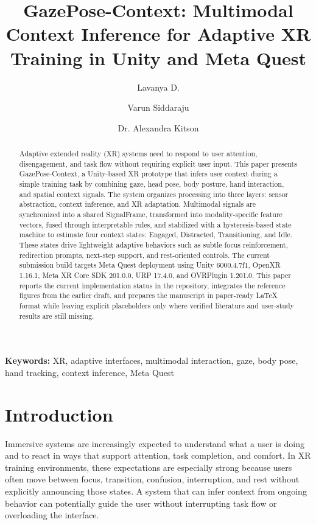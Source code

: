 \documentclass[10pt,twocolumn]{article}
\title{\textbf{GazePose-Context: Multimodal Context Inference for Adaptive XR Training in Unity and Meta Quest}}
\author{
  Lavanya D. \and Varun Siddaraju \and Dr. Alexandra Kitson
}
\date{}
\begin{document}
\maketitle

\begin{abstract}
Adaptive extended reality (XR) systems need to respond to user attention, disengagement, and task flow without requiring explicit user input. This paper presents GazePose-Context, a Unity-based XR prototype that infers user context during a simple training task by combining gaze, head pose, body posture, hand interaction, and spatial context signals. The system organizes processing into three layers: sensor abstraction, context inference, and XR adaptation. Multimodal signals are synchronized into a shared SignalFrame, transformed into modality-specific feature vectors, fused through interpretable rules, and stabilized with a hysteresis-based state machine to estimate four context states: Engaged, Distracted, Transitioning, and Idle. These states drive lightweight adaptive behaviors such as subtle focus reinforcement, redirection prompts, next-step support, and rest-oriented controls. The current submission build targets Meta Quest deployment using Unity 6000.4.7f1, OpenXR 1.16.1, Meta XR Core SDK 201.0.0, URP 17.4.0, and OVRPlugin 1.201.0. This paper reports the current implementation status in the repository, integrates the reference figures from the earlier draft, and prepares the manuscript in paper-ready LaTeX format while leaving explicit placeholders only where verified literature and user-study results are still missing.
\end{abstract}

\textbf{Keywords:} XR, adaptive interfaces, multimodal interaction, gaze, body pose, hand tracking, context inference, Meta Quest

\section{Introduction}
Immersive systems are increasingly expected to understand what a user is doing and to react in ways that support attention, task completion, and comfort. In XR training environments, these expectations are especially strong because users often move between focus, transition, confusion, interruption, and rest without explicitly announcing those states. A system that can infer context from ongoing behavior can potentially guide the user without interrupting task flow or overloading the interface.
\end{document}
